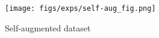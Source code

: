 \begin{figure}[htb]
  \centering
  \texttt{[image: figs/exps/self-aug\_fig.png]}
  \caption{Self-augmented dataset }
  \label{fig:self_aug}
\end{figure}